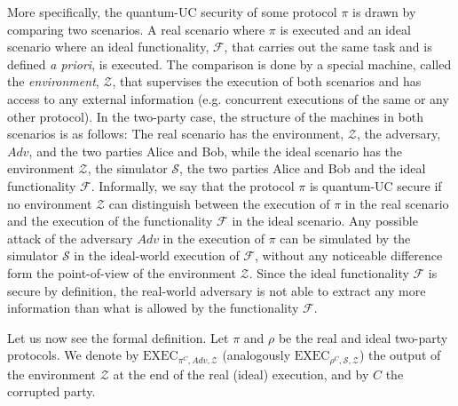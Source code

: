 More specifically, the quantum-UC security of some protocol $\mathcal{\pi}$ is drawn by comparing two scenarios. A real scenario where  $\mathcal{\pi}$ is executed and an ideal scenario where an ideal functionality, $\mathcal{F}$,  that carries out the same task and is defined \textit{a priori}, is executed. The comparison is done by a special machine, called the \textit{environment}, $\mathcal{Z}$, that supervises the execution of both scenarios and has access to any external information (e.g. concurrent executions of the same or any other protocol). In the two-party case, the structure of the machines in both scenarios is as follows: The real scenario has the environment, $\mathcal{Z}$, the adversary, $Adv$, and the two parties Alice  and Bob, while the ideal scenario has the environment $\mathcal{Z}$, the simulator $\mathcal{S}$, the two parties Alice and Bob and the ideal functionality $\mathcal{F}$. 
Informally, we say that the protocol $\mathcal{\pi}$ is quantum-UC secure if no environment $\mathcal{Z}$ can distinguish between the execution of $\mathcal{\pi}$ in the real scenario and  the execution of the  functionality $\mathcal{F}$ in the ideal scenario. Any possible attack of the adversary $Adv$ in the execution of $\mathcal{\pi}$ can be simulated by the simulator $\mathcal{S}$ in the ideal-world execution of $\mathcal{F}$, without any noticeable difference form the point-of-view of the environment $\mathcal{Z}$. Since the ideal functionality $\mathcal{F}$ is secure by definition, the real-world adversary is not able to extract any more information than what is allowed by the functionality $\mathcal{F}$. %

Let us now see the formal definition. Let $\mathcal{\pi}$ and $\rho$ be the real and ideal two-party protocols. We denote by $\text{EXEC}_{\mathcal{\pi}^C, Adv, \mathcal{Z}}$ (analogously $\text{EXEC}_{\rho^C, \mathcal{S}, \mathcal{Z}}$) the output of the environment $\mathcal{Z}$ at the end of the real (ideal) execution, and by $C$ the corrupted party. 

